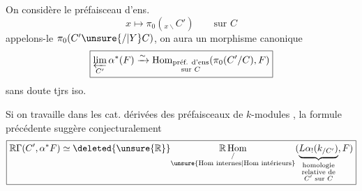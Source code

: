 On considère le préfaisceau d'ens.
\[
x\longmapsto\pi_0({}_{x\backslash}C')\qquad\text{sur }C
\]
appelons-le $\pi_0(C'\unsure{\mathbin{/}|\mathbin{Y}}C)$, on aura un morphisme canonique
\[
\boxed{\varprojlim_{C'}\alpha^*(F)\xrightarrow{\sim}
\operatorname{Hom}_{\substack{\text{préf. d'ens}\\\text{sur }C}}(\pi_0(C'/C),F)}
\]
sans doute tjrs iso.

Si on travaille dans les cat. dérivées des préfaisceaux de $k$-modules , la formule précédente suggère conjecturalement
\[
\boxed{\mathbb R\Gamma(C',\alpha^*F)\simeq\deleted{\unsure{\mathbb R}}
\underset{\substack{/\\\text{\unsure{Hom internes|Hom intérieurs}}}}{\mathbb R\operatorname{Hom}}
(\underbrace{L\alpha_!(k_{/C'})}_{\substack{\text{homologie}\\\text{relative de}\\C'\text{ sur }C}},F)}
\]

